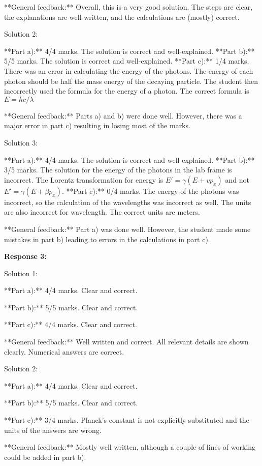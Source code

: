 \documentclass[a4paper,11pt]{article}
\begin{document}
**General feedback:** Overall, this is a very good solution. The steps are clear, the explanations are well-written, and the calculations are (mostly) correct.

Solution 2:

**Part a):** 4/4 marks. The solution is correct and well-explained.
**Part b):** 5/5 marks. The solution is correct and well-explained.
**Part c):** 1/4 marks. There was an error in calculating the energy of the photons. The energy of each photon should be half the mass energy of the decaying particle. The student then incorrectly used the formula for the energy of a photon. The correct formula is \( E = hc/\lambda \)

**General feedback:** Parts a) and b) were done well. However, there was a major error in part c) resulting in losing most of the marks. 

Solution 3:

**Part a):** 4/4 marks. The solution is correct and well-explained.
**Part b):** 3/5 marks. The solution for the energy of the photons in the lab frame is incorrect. The Lorentz transformation for energy is \( E' = \gamma(E + v p_x) \) and not \( E' = \gamma(E + \beta p_x) \). 
**Part c):** 0/4 marks. The energy of the photons was incorrect, so the calculation of the wavelengths was incorrect as well. The units are also incorrect for wavelength. The correct units are meters.

**General feedback:** Part a) was done well. However, the student made some mistakes in part b) leading to errors in the calculations in part c).

\bigskip    
\textbf{Response 3:}

Solution 1:

**Part a):** 4/4 marks. Clear and correct.

**Part b):** 5/5 marks. Clear and correct.

**Part c):** 4/4 marks. Clear and correct.

**General feedback:** Well written and correct. All relevant details are shown clearly. Numerical answers are correct.


Solution 2:

**Part a):** 4/4 marks. Clear and correct.

**Part b):** 5/5 marks. Clear and correct.

**Part c):** 3/4 marks. Planck's constant is not explicitly substituted and the units of the answers are wrong.

**General feedback:** Mostly well written, although a couple of lines of working could be added in part b).
\end{document}
